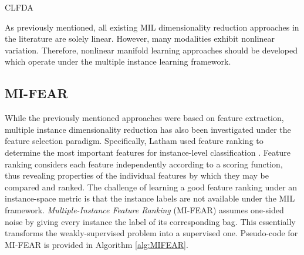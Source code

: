 \begin{algorithm}
	\caption{CLFDA}
	\label{alg:CLFDA}
	\begin{algorithmic}[1]
		\Else
		\EndIf
		\EndFor             
	\end{algorithmic}
\end{algorithm}

As previously mentioned, all existing MIL dimensionality reduction approaches in the literature are solely linear.  However, many modalities exhibit nonlinear variation.  Therefore, nonlinear manifold learning approaches should be developed which operate under the multiple instance learning framework. 

\subsection{MI-FEAR}
While the previously mentioned approaches were based on feature extraction,  multiple instance dimensionality reduction has also been investigated under the feature selection paradigm.  Specifically, Latham used feature ranking to determine the most important features for instance-level classification \citep{Latham2015MIFeatureRankingThesis}.  Feature ranking considers each feature independently according to a scoring function, thus revealing properties of the individual features by which they may be compared and ranked.  The challenge of learning a good feature ranking under an instance-space metric is that the instance labels are not available under the MIL framework.  \textit{Multiple-Instance Feature Ranking} (MI-FEAR) assumes one-sided noise by giving every instance the label of its corresponding bag.  This essentially transforms the weakly-supervised problem into a supervised one.  Pseudo-code for MI-FEAR is provided in Algorithm \ref{alg:MIFEAR}.

